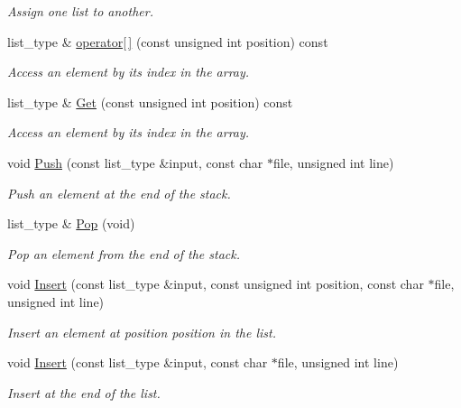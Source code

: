 \begin{DoxyCompactItemize}
\begin{DoxyCompactList}\small\item\em Assign one list to another. \end{DoxyCompactList}\item 
list\-\_\-type \& \hyperlink{class_data_structures_1_1_list_a028d64be4f2c6945be0f31a48b80823a}{operator\mbox{[}$\,$\mbox{]}} (const unsigned int position) const 
\begin{DoxyCompactList}\small\item\em Access an element by its index in the array. \end{DoxyCompactList}\item 
list\-\_\-type \& \hyperlink{class_data_structures_1_1_list_a46ce8d0ed396b4de4cc3d4af3e6965db}{Get} (const unsigned int position) const 
\begin{DoxyCompactList}\small\item\em Access an element by its index in the array. \end{DoxyCompactList}\item 
void \hyperlink{class_data_structures_1_1_list_a771fc63e3b0d892fbb605a379a78bacb}{Push} (const list\-\_\-type \&input, const char $\ast$file, unsigned int line)
\begin{DoxyCompactList}\small\item\em Push an element at the end of the stack. \end{DoxyCompactList}\item 
list\-\_\-type \& \hyperlink{class_data_structures_1_1_list_a9be46e78d21543bf28bd473807160024}{Pop} (void)
\begin{DoxyCompactList}\small\item\em Pop an element from the end of the stack. \end{DoxyCompactList}\item 
void \hyperlink{class_data_structures_1_1_list_a5cb7d8b68d8d020a34f2186ea8d5b1c6}{Insert} (const list\-\_\-type \&input, const unsigned int position, const char $\ast$file, unsigned int line)
\begin{DoxyCompactList}\small\item\em Insert an element at position {\itshape position} in the list. \end{DoxyCompactList}\item 
void \hyperlink{class_data_structures_1_1_list_adfe61ff53151ab61ecba6f8506a4662f}{Insert} (const list\-\_\-type \&input, const char $\ast$file, unsigned int line)
\begin{DoxyCompactList}\small\item\em Insert at the end of the list. \end{DoxyCompactList}\item 

\end{DoxyCompactItemize}
